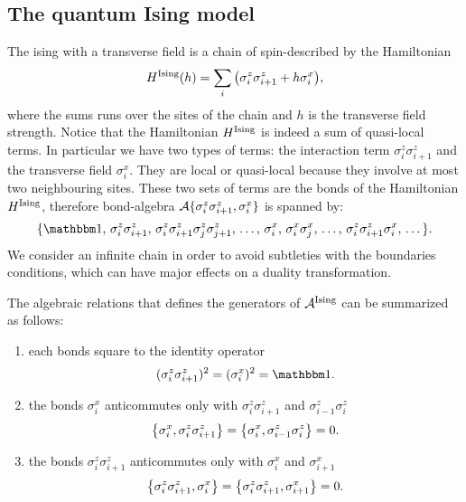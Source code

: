 \subsection{The quantum Ising model}
\label{sub:the_quantum_ising_model}

The \acl{ising} with a transverse field is a chain of spin-\onehalf described by the Hamiltonian
\begin{equation}
    H^{\text{Ising}}(h) = \sum_{i} \qty( \sigma^z_i \sigma^z_{i+1} + h \sigma^x_i ),
    \label{eq:hamiltonian_ising}
\end{equation}
where the sums runs over the sites of the chain and $h$ is the transverse field strength.
Notice that the Hamiltonian $H^{\text{Ising}}$ is indeed a sum of quasi-local terms.
In particular we have two types of terms: the interaction term $\sigma^z_i \sigma^z_{i+1}$ and the transverse field $\sigma^x_i$.
They are local or quasi-local because they involve at most two neighbouring sites.
These two sets of terms are the bonds of the Hamiltonian $H^{\text{Ising}}$, therefore bond-algebra $\mathcal{A} \{\sigma^z_i \sigma^z_{i+1}, \sigma^x_i\}$ is spanned by:
\begin{equation*}
    \{
        \identity, \,
        \sigma^z_i \sigma^z_{i+1}, \,
        \sigma^z_i \sigma^z_{i+1} \sigma^z_j \sigma^z_{j+1}, \,
        \dots, \,
        \sigma^x_i, \,
        \sigma^x_i \sigma^x_j, \,
        \dots, \,
        \sigma^z_i \sigma^z_{i+1} \sigma^x_i, \,
        \dots
    \}.
\end{equation*}
We consider an infinite chain in order to avoid subtleties with the boundaries conditions, which can have major effects on a duality transformation.

The algebraic relations that defines the generators of $\mathcal{A}^{\text{Ising}}$ can be summarized as follows:
\begin{enumerate}
    \item each bonds square to the identity operator
        \begin{equation*}
            (\sigma^z_i \sigma^z_{i+1})^2 = (\sigma^x_i)^2 = \identity.
        \end{equation*}

    \item the bonds $\sigma_i^x$ anticommutes only with $\sigma^z_i \sigma^z_{i+1}$ and $\sigma^z_{i-1} \sigma^z_i$
        \begin{equation*}
            \acomm{\sigma_i^x}{\sigma^z_i \sigma^z_{i+1}} =
            \acomm{\sigma_i^x}{\sigma^z_{i-1} \sigma^z_i} = 0.
        \end{equation*}

    \item the bonds $\sigma^z_i \sigma^z_{i+1}$ anticommutes only with $\sigma^x_i$ and $\sigma^x_{i+1}$
        \begin{equation*}
            \acomm{\sigma^z_i \sigma^z_{i+1}}{\sigma^x_i} =
            \acomm{\sigma^z_i \sigma^z_{i+1}}{\sigma^x_{i+1}} = 0.
        \end{equation*}
\end{enumerate}

